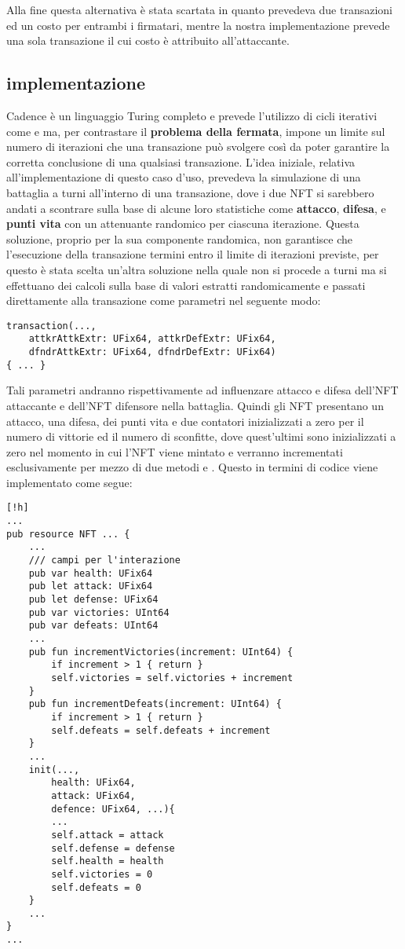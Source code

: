 Alla fine questa alternativa è stata scartata in quanto prevedeva due transazioni ed un costo per entrambi i firmatari, mentre la nostra implementazione prevede una sola transazione il cui costo è attribuito all'attaccante.

\subsection{implementazione}
Cadence è un linguaggio Turing completo e prevede l'utilizzo di cicli iterativi come  e  ma, per contrastare il \textbf{problema della fermata}, impone un limite sul numero di iterazioni che una transazione può svolgere così da poter garantire la corretta conclusione di una qualsiasi transazione. L'idea iniziale, relativa all'implementazione di questo caso d'uso, prevedeva la simulazione di una battaglia a turni all'interno di una transazione, dove i due NFT si sarebbero andati a scontrare sulla base di alcune loro statistiche come \textbf{attacco}, \textbf{difesa}, e \textbf{punti vita} con un attenuante randomico per ciascuna iterazione. Questa soluzione, proprio per la sua componente randomica, non garantisce che l'esecuzione della transazione termini entro il limite di iterazioni previste, per questo è stata scelta un'altra soluzione nella quale non si procede a turni ma si effettuano dei calcoli sulla base di valori estratti randomicamente e passati direttamente alla transazione come parametri nel seguente modo:
\begin{lstlisting}[style=all, style=cadence]
transaction(..., 
	attkrAttkExtr: UFix64, attkrDefExtr: UFix64, 
    dfndrAttkExtr: UFix64, dfndrDefExtr: UFix64)
{ ... }
\end{lstlisting}
Tali parametri andranno rispettivamente ad influenzare attacco e difesa dell'NFT attaccante e dell'NFT difensore nella battaglia. Quindi gli NFT presentano un attacco, una difesa, dei punti vita e due contatori inizializzati a zero per il numero di vittorie ed il numero di sconfitte, dove quest'ultimi sono inizializzati a zero nel momento in cui l'NFT viene mintato e verranno incrementati esclusivamente per mezzo di due metodi  e . Questo in termini di codice viene implementato come segue:
\begin{lstlisting}[style=all, style=cadence][!h]
...
pub resource NFT ... {
	...
    /// campi per l'interazione
    pub var health: UFix64
    pub let attack: UFix64
    pub let defense: UFix64
    pub var victories: UInt64 
    pub var defeats: UInt64
    ...
    pub fun incrementVictories(increment: UInt64) {
        if increment > 1 { return }
        self.victories = self.victories + increment
    }
    pub fun incrementDefeats(increment: UInt64) {
        if increment > 1 { return }
        self.defeats = self.defeats + increment
    }
	...
	init(...,
		health: UFix64,
       	attack: UFix64,
        defence: UFix64, ...){
		...
		self.attack = attack
        self.defense = defense
        self.health = health
        self.victories = 0
        self.defeats = 0
	}
	...
}
...
\end{lstlisting}
